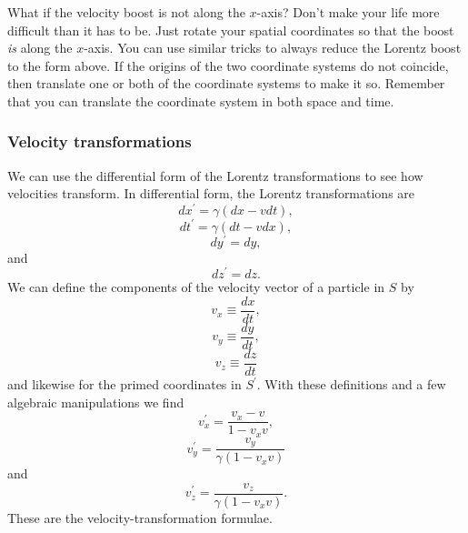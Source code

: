 \documentclass{article}
\begin{document}
What if the velocity boost is not along the $x$-axis? Don't make your life more difficult than it has to be. Just rotate your spatial coordinates so that the boost \emph{is} along the $x$-axis. You can use similar tricks to always reduce the Lorentz boost to the form above. If the origins of the two coordinate systems do not coincide, then translate one or both of the coordinate systems to make it so. Remember that you can translate the coordinate system in both space and time.

\subsubsection*{Velocity transformations}

We can use the differential form of the Lorentz transformations to see how velocities transform. In differential form, the Lorentz transformations are \begin{equation} dx^\prime = \gamma ( dx - v dt ) , \end{equation} \begin{equation}  dt^\prime = \gamma ( dt -  v dx ) , \end{equation} \begin{equation} dy^\prime = dy , \end{equation} and \begin{equation} dz^\prime = dz . \end{equation} We can define the components of the velocity vector of a particle in $S$ by \begin{equation} v_x \equiv \frac{dx}{dt} , \end{equation} \begin{equation} v_y \equiv \frac{dy}{dt} , \end{equation} \begin{equation} v_z \equiv \frac{dz}{dt} \end{equation} and likewise for the primed coordinates in $S^\prime$. With these definitions and a few algebraic manipulations we find \begin{equation} v_x^\prime = \frac{ v_x - v }{1 - v_x v} , \end{equation} \begin{equation} v_y^\prime = \frac{v_y}{\gamma ( 1 - v_x v )} \end{equation} and \begin{equation} v_z^\prime = \frac{v_z}{\gamma ( 1 - v_x v )} . \end{equation} These are the velocity-transformation formulae.
\end{document}
